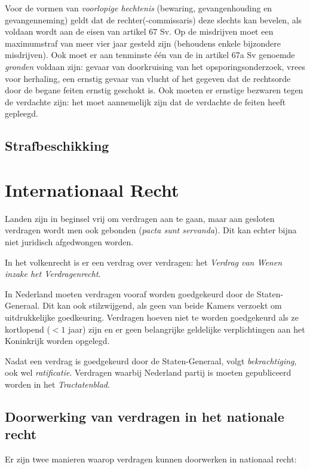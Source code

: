 \documentclass{article}
\begin{document}
Voor de vormen van \emph{voorlopige hechtenis} (bewaring, gevangenhouding en
gevangenneming) geldt dat de rechter(-commissaris) deze slechts kan bevelen,
als voldaan wordt aan de eisen van artikel 67 Sv. Op de misdrijven moet een
maximumstraf van meer vier jaar gesteld zijn (behoudens enkele bijzondere
misdrijven). Ook moet er aan tenminste \'e\'en van de in artikel 67a Sv
genoemde \emph{gronden} voldaan zijn: gevaar van doorkruising van het
opsporingsonderzoek, vrees voor herhaling, een ernstig gevaar van vlucht of het
gegeven dat de rechtsorde door de begane feiten ernstig geschokt is. Ook moeten
er ernstige bezwaren tegen de verdachte zijn: het moet aannemelijk zijn dat de
verdachte de feiten heeft gepleegd.

\subsection{Strafbeschikking}

\section{Internationaal Recht} \label{h15}

Landen zijn in beginsel vrij om verdragen aan te gaan, maar aan gesloten
verdragen wordt men ook gebonden (\emph{pacta sunt servanda}). Dit kan echter
bijna niet juridisch afgedwongen worden.

In het volkenrecht is er een verdrag over verdragen: het \emph{Verdrag van
Wenen inzake het Verdragenrecht}.

In Nederland moeten verdragen vooraf worden goedgekeurd door de
Staten-Generaal. Dit kan ook stilzwijgend, als geen van beide Kamers verzoekt
om uitdrukkelijke goedkeuring. Verdragen hoeven niet te worden goedgekeurd als
ze kortlopend ($<1$ jaar) zijn en er geen belangrijke geldelijke verplichtingen
aan het Koninkrijk worden opgelegd.

Nadat een verdrag is goedgekeurd door de Staten-Generaal, volgt
\emph{bekrachtiging}, ook wel \emph{ratificatie}. Verdragen waarbij Nederland
partij is moeten gepubliceerd worden in het \emph{Tractatenblad}.

\subsection{Doorwerking van verdragen in het nationale recht}

Er zijn twee manieren waarop verdragen kunnen doorwerken in nationaal recht:
\end{document}
